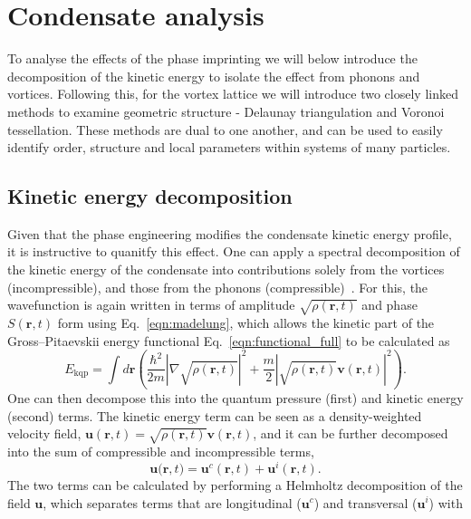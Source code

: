 \section{Condensate analysis}\label{sec:con_analysis}
To analyse the effects of the phase imprinting we will below introduce the decomposition of the kinetic energy to isolate the effect from phonons and vortices. Following this, for the vortex lattice we will introduce two closely linked methods to examine geometric structure - Delaunay triangulation and Voronoi tessellation. These methods are dual to one another, and can be used to easily identify order, structure and local parameters within systems of many particles.

\subsection{Kinetic energy decomposition}\label{sec:kinspec}
Given that the phase engineering modifies the condensate kinetic energy profile, it is instructive to quanitfy this effect. One can apply a spectral decomposition of the kinetic energy of the condensate into contributions solely from the vortices (incompressible), and those from the phonons (compressible)~\cite{CT:Nore_prl_1997,CT:Nore_pof_1997,CT:Bradley_prx_2012}. For this, the wavefunction is again written in terms of amplitude $\sqrt{\rho(\mathbf{r},t)}$ and phase $S(\mathbf{r},t)$ form using Eq.~\eqref{eqn:madelung}, which allows the kinetic part of the Gross--Pitaevskii energy functional Eq.~\eqref{eqn:functional_full} to be calculated as
\begin{equation}
    E_{\text{kqp}} = \int d\mathbf{r} \left( \frac{\hbar^2}{2m}| \nabla\sqrt{\rho(\mathbf{r},t)} |^2  + \frac{m}{2}|\sqrt{\rho(\mathbf{r},t)}\mathbf{v}(\mathbf{r},t) |^2\right).
\end{equation}
One can then decompose this into the quantum pressure (first) and kinetic energy (second) terms. The kinetic energy term can be seen as a density-weighted velocity field, $\mathbf{u}(\mathbf{r},t) = \sqrt{\rho(\mathbf{r},t)}\mathbf{v}(\mathbf{r},t)$, and it can be further decomposed into the sum of compressible and incompressible terms,
\begin{equation}\label{eqn:kin_en}
    \mathbf{u(r},t) = \mathbf{u}^c(\mathbf{r},t) + \mathbf{u}^i(\mathbf{r},t).
\end{equation}
The two terms can be calculated by performing a Helmholtz decomposition of the field $\mathbf{u}$, which separates terms that are longitudinal ($\mathbf{u}^c$) and transversal ($\mathbf{u}^i$) with
